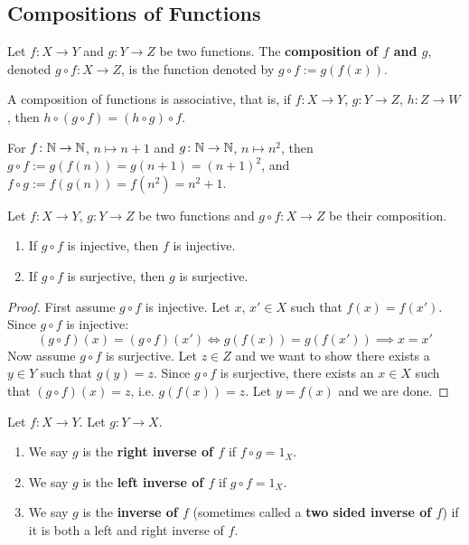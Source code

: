 \subsection{Compositions of Functions}

\begin{defbox}
   Let $f \colon X \to Y$ and $g \colon Y \to Z$ be two functions. The \textbf{composition of $f$ and $g$}, denoted $g \circ f \colon X \to Z$, is the function denoted by $g \circ f := g(f(x))$. 
\end{defbox}

\begin{remark}
   A composition of functions is associative, that is, if $f \colon X \to Y$, $g \colon Y \to Z$, $h \colon Z \to W$, then $h \circ (g \circ f) = (h \circ g) \circ f$.
\end{remark}

\begin{example}
   For $f \colon \mathbb{N} \to \mathbb{N}$, $n \mapsto n + 1$ and $g \colon \mathbb{N} \to \mathbb{N}$, $n \mapsto n^2$, then $g \circ f := g(f(n)) = g(n+1) = (n+1)^2$, and $f \circ g := f(g(n)) = f(n^2) = n^2 + 1$. 
\end{example}

\begin{propbox}
   Let $f \colon X \to Y$, $g \colon Y \to Z$ be two functions and $g \circ f \colon X \to Z$ be their composition. 
   \begin{enumerate}
      \item If $g \circ f$ is injective, then $f$ is injective.
      \item If $g \circ f$ is surjective, then $g$ is surjective.
   \end{enumerate}
\end{propbox}

\begin{proof}
   First assume $g \circ f$ is injective. Let $x$, $x' \in X$ such that $f(x) = f(x')$. Since $g \circ f$ is injective:
   \[ (g \circ f)(x) = (g \circ f)(x') \iff g(f(x)) = g(f(x')) \implies x = x' \] 
   Now assume $g \circ f$ is surjective. Let $z \in Z$ and we want to show there exists a $y \in Y$ such that $g(y) = z$. Since $g \circ f$ is surjective, there exists an $x \in X$ such that $(g \circ f)(x) = z$, i.e. $g(f(x)) = z$. Let $y = f(x)$ and we are done. 
\end{proof}

\begin{defbox}
   Let $f \colon X \to Y$. Let $g \colon Y \to X$.
   \begin{enumerate}
      \item We say $g$ is the \textbf{right inverse of $f$} if $f \circ g = \text{1}_X$.
      \item We say $g$ is the \textbf{left inverse of $f$} if $g \circ f = \text{1}_X$.
      \item We say $g$ is the \textbf{inverse of $f$} (sometimes called a \textbf{two sided inverse of $f$}) if it is both a left and right inverse of $f$.
   \end{enumerate}
\end{defbox}


